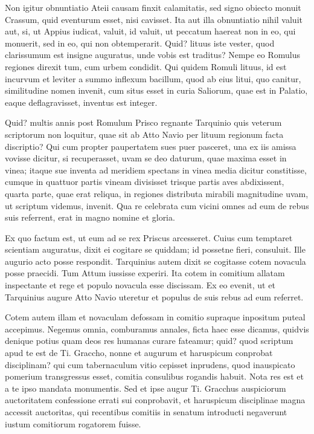  Non igitur obnuntiatio Ateii causam finxit calamitatis, sed signo obiecto monuit Crassum, quid eventurum esset, nisi cavisset. Ita aut illa obnuntiatio nihil valuit aut, si, ut Appius iudicat, valuit, id valuit, ut peccatum haereat non in eo, qui monuerit, sed in eo, qui non obtemperarit. Quid? lituus iste vester, quod clarissumum est insigne auguratus, unde vobis est traditus? Nempe eo Romulus regiones direxit tum, cum urbem condidit. Qui quidem Romuli lituus, id est incurvum et leviter a summo inflexum bacillum, quod ab eius litui, quo canitur, similitudine nomen invenit, cum situs esset in curia Saliorum, quae est in Palatio, eaque deflagravisset, inventus est integer.

 Quid? multis annis post Romulum Prisco regnante Tarquinio quis veterum scriptorum non loquitur, quae sit ab Atto Navio per lituum regionum facta discriptio? Qui cum propter paupertatem sues puer pasceret, una ex iis amissa vovisse dicitur, si recuperasset, uvam se deo daturum, quae maxima esset in vinea; itaque sue inventa ad meridiem spectans in vinea media dicitur constitisse, cumque in quattuor partis vineam divisisset trisque partis aves abdixissent, quarta parte, quae erat reliqua, in regiones distributa mirabili magnitudine uvam, ut scriptum videmus, invenit. Qua re celebrata cum vicini omnes ad eum de rebus suis referrent, erat in magno nomine et gloria.

 Ex quo factum est, ut eum ad se rex Priscus arcesseret. Cuius cum temptaret scientiam auguratus, dixit ei cogitare se quiddam; id possetne fieri, consuluit. Ille augurio acto posse respondit. Tarquinius autem dixit se cogitasse cotem novacula posse praecidi. Tum Attum iussisse experiri. Ita cotem in comitium allatam inspectante et rege et populo novacula esse discissam. Ex eo evenit, ut et Tarquinius augure Atto Navio uteretur et populus de suis rebus ad eum referret.

 Cotem autem illam et novaculam defossam in comitio supraque inpositum puteal accepimus. Negemus omnia, comburamus annales, ficta haec esse dicamus, quidvis denique potius quam deos res humanas curare fateamur; quid? quod scriptum apud te est de Ti. Graccho, nonne et augurum et haruspicum conprobat disciplinam? qui cum tabernaculum vitio cepisset inprudens, quod inauspicato pomerium transgressus esset, comitia consulibus rogandis habuit. Nota res est et a te ipso mandata monumentis. Sed et ipse augur Ti. Gracchus auspiciorum auctoritatem confessione errati sui conprobavit, et haruspicum disciplinae magna accessit auctoritas, qui recentibus comitiis in senatum introducti negaverunt iustum comitiorum rogatorem fuisse.

